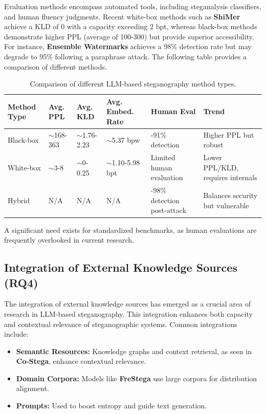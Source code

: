 Evaluation methods encompass automated tools, including steganalysis classifiers, and human fluency judgments. Recent white-box methods such as \textbf{ShiMer} achieve a KLD of 0 with a capacity exceeding 2 bpt, whereas black-box methods demonstrate higher PPL (average of 100-300) but provide superior accessibility. For instance, \textbf{Ensemble Watermarks} achieves a 98\% detection rate but may degrade to 95\% following a paraphrase attack. The following table provides a comparison of different methods.

\begin{table}[h]
	\centering
	\small
	\caption{Comparison of different LLM-based steganography method types.}
	\label{tab:comparison}
	\begin{tabular}{|>{\raggedright\arraybackslash}p{2.2cm}|>{\raggedright\arraybackslash}p{1.5cm}|>{\raggedright\arraybackslash}p{1.5cm}|>{\raggedright\arraybackslash}p{2cm}|>{\raggedright\arraybackslash}p{2.2cm}|>{\raggedright\arraybackslash}p{2.8cm}|}
		\hline
		\textbf{Method Type} & \textbf{Avg. PPL} & \textbf{Avg. KLD} & \textbf{Avg. Embed. Rate} & \textbf{Human Eval}           & \textbf{Trend}                    \\
		\hline
		Black-box            & $\sim$168-363     & $\sim$1.76-2.23   & $\sim$5.37 bpw            & 79-91\% detection             & Higher PPL but robust             \\
		\hline
		White-box            & $\sim$3-8         & $\sim$0-0.25      & $\sim$1.10-5.98 bpt       & Limited human evaluation      & Lower PPL/KLD, requires internals \\
		\hline
		Hybrid               & N/A               & N/A               & N/A                       & 95-98\% detection post-attack & Balances security but vulnerable  \\
		\hline
	\end{tabular}
\end{table}

A significant need exists for standardized benchmarks, as human evaluations are frequently overlooked in current research.

\subsection{Integration of External Knowledge Sources (RQ4)}
\label{subsec:rq4}

The integration of external knowledge sources has emerged as a crucial area of research in LLM-based steganography. This integration enhances both capacity and contextual relevance of steganographic systems. Common integrations include:
\begin{itemize}
	\item \textbf{Semantic Resources:} Knowledge graphs and context retrieval, as seen in \textbf{Co-Stega}, enhance contextual relevance.
	\item \textbf{Domain Corpora:} Models like \textbf{FreStega} use large corpora for distribution alignment.
	\item \textbf{Prompts:} Used to boost entropy and guide text generation.
\end{itemize}

